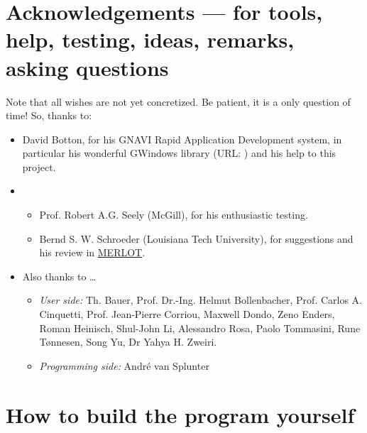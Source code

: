 \documentclass[11pt,a4paper]{article}
\begin{document}
\section{Acknowledgements --- for tools, help, testing, ideas,
remarks, asking questions}
%
Note that all wishes are not yet concretized. Be patient, it is a
only question of time! So, thanks to:
%
\begin{itemize}
  \item David Botton, for his GNAVI Rapid Application Development system, in
        particular his wonderful GWindows library (URL:
        )
        and his help to this project.
  \item
  \begin{itemize}
    \item
        Prof. Robert A.G. Seely (McGill), for his enthusiastic testing.
    \item
        Bernd S. W. Schroeder (Louisiana Tech University), for suggestions
        and his review in \href{http://www.merlot.org/}{MERLOT}.
  \end{itemize}
  \item Also thanks to \ldots
    \begin{itemize}
    \item {\em User side:}
        Th. Bauer,
        Prof. Dr.-Ing. Helmut Bollenbacher,
        Prof. Carlos A. Cinquetti,
        Prof. Jean-Pierre Corriou,
        Maxwell Dondo,
        Zeno Enders,
        Roman Heinisch,
        Shul-John Li,
        Alessandro Rosa,
        Paolo Tommasini,
        Rune T\o nnesen,
        Song Yu,
        Dr Yahya H. Zweiri.
    \item {\em Programming side:}
        Andr\'e van Splunter
  \end{itemize}
\end{itemize}
%
\section{How to build the program yourself}
%
\end{document}
